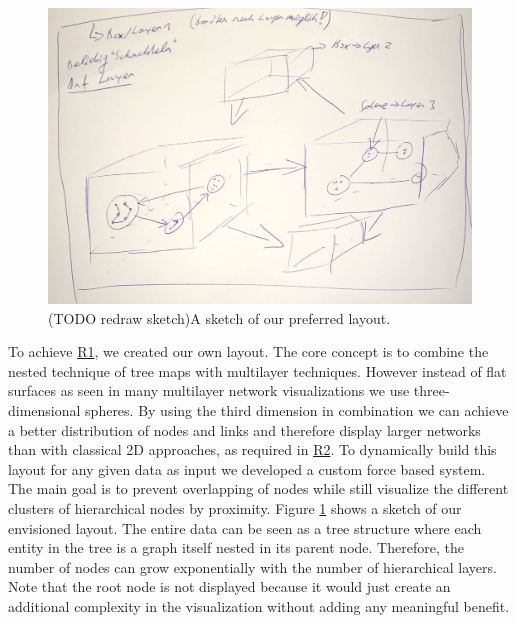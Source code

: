 \begin{figure}[h]
    \centering
    \includegraphics[width=1\textwidth]{chapters/graphics/concept1.jpg}
    \caption{(TODO redraw sketch)A sketch of our preferred layout. } 
    \label{fig:layoutSketch} 
\end{figure}
To achieve \hyperref[req:R1]{R1}, we created our own layout. The core concept is to combine the nested technique of tree maps with multilayer techniques. However instead of flat surfaces as seen in many multilayer network visualizations we use three-dimensional spheres. 
By using the third dimension in combination we can achieve a better distribution of nodes and links and therefore display larger networks than with classical 2D approaches, as required in \hyperref[req:R2]{R2}. 
To dynamically build this layout for any given data as input we developed a custom force based system.
The main goal is to prevent overlapping of nodes while still visualize the different clusters of hierarchical nodes by proximity. Figure \ref{fig:layoutSketch} shows a sketch of our envisioned layout. The entire data can be seen as a tree structure where each entity in the tree is a graph itself nested in its parent node. Therefore, the number of nodes can grow exponentially with the number of hierarchical layers. Note that the root node is not displayed because it would just create an additional complexity in the visualization without adding any meaningful benefit.


